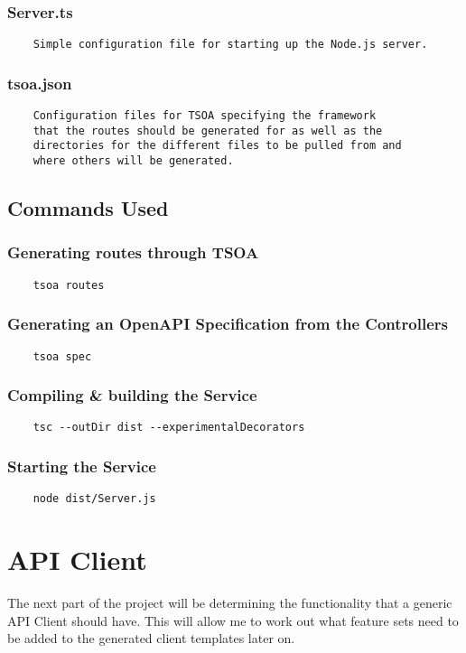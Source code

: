 \subsubsection{Server.ts}
\begin{verbatim}
    Simple configuration file for starting up the Node.js server.
\end{verbatim}
\subsubsection{tsoa.json}
\begin{verbatim}
    Configuration files for TSOA specifying the framework 
    that the routes should be generated for as well as the 
    directories for the different files to be pulled from and 
    where others will be generated.
\end{verbatim}
\subsection{Commands Used}
\subsubsection{Generating routes through TSOA}
\begin{verbatim}
    tsoa routes
\end{verbatim}
\subsubsection{Generating an OpenAPI Specification from the Controllers}
\begin{verbatim}
    tsoa spec
\end{verbatim}
\subsubsection{Compiling \& building the Service}
\begin{verbatim}
    tsc --outDir dist --experimentalDecorators
\end{verbatim}
\subsubsection{Starting the Service}
\begin{verbatim}
    node dist/Server.js
\end{verbatim}

\section{API Client}
The next part of the project will be determining the functionality that a generic API Client should have. This will allow me to work out what feature sets need to be added to the generated client templates later on. 

